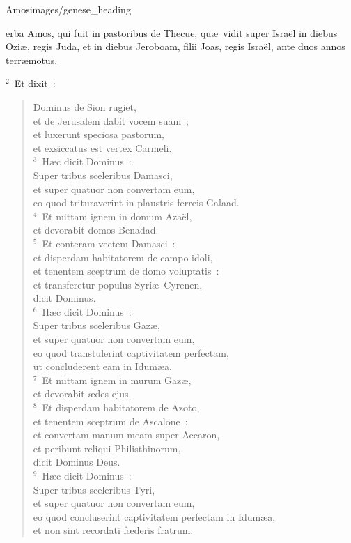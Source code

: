 {Amos}{images/genese_heading}


\bchapter
{}erba Amos, qui fuit in pastoribus de Thecue, qu\ae\ vidit super Isra\"el in diebus Ozi\ae , regis Juda, et in diebus Jeroboam, filii Joas, regis Isra\"el, ante duos annos terr\ae motus.


${}^{2}$~Et dixit~: \begin{flushleft}\begin{verse}Dominus de Sion rugiet,\\ et de Jerusalem dabit vocem suam~;\\ et luxerunt speciosa pastorum,\\ et exsiccatus est vertex Carmeli.\\
${}^{3}$~H\ae c dicit Dominus~:\\ Super tribus sceleribus Damasci,\\ et super quatuor non convertam eum,\\ eo quod trituraverint in plaustris ferreis Galaad.\\
${}^{4}$~Et mittam ignem in domum Aza\"el,\\ et devorabit domos Benadad.\\
${}^{5}$~Et conteram vectem Damasci~:\\ et disperdam habitatorem de campo idoli,\\ et tenentem sceptrum de domo voluptatis~:\\ et transferetur populus Syri\ae\ Cyrenen,\\ dicit Dominus.\\
${}^{6}$~H\ae c dicit Dominus~:\\ Super tribus sceleribus Gaz\ae ,\\ et super quatuor non convertam eum,\\ eo quod transtulerint captivitatem perfectam,\\ ut concluderent eam in Idum\ae a.\\
${}^{7}$~Et mittam ignem in murum Gaz\ae ,\\ et devorabit \ae des ejus.\\
${}^{8}$~Et disperdam habitatorem de Azoto,\\ et tenentem sceptrum de Ascalone~:\\ et convertam manum meam super Accaron,\\ et peribunt reliqui Philisthinorum,\\ dicit Dominus Deus.\\
${}^{9}$~H\ae c dicit Dominus~:\\ Super tribus sceleribus Tyri,\\ et super quatuor non convertam eum,\\ eo quod concluserint captivitatem perfectam in Idum\ae a,\\ et non sint recordati fœderis fratrum.\\

\end{verse}
\end{flushleft}

